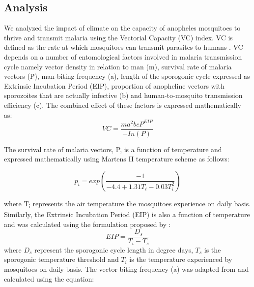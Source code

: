\documentclass[utf8]{FrontiersinHarvard} %
\begin{document}
\subsection{Analysis}
We analyzed the impact of climate on the capacity of anopheles mosquitoes to thrive and transmit malaria using the Vectorial Capacity (VC) index.  VC is defined as the rate at which mosquitoes can transmit parasites to humans \citep{Shapiro2017}. VC depends on a number of entomological factors involved in malaria transmission cycle namely vector density in relation to man (m), survival rate of malaria vectors (P), man-biting frequency (a), length of the sporogonic cycle expressed as Extrinsic Incubation Period (EIP), proportion of anopheline vectors with sporozoites that are actually infective (b) and human-to-mosquito transmission efficiency (c). The combined effect of these factors is expressed mathematically  \citep{paaijmans2012warmer} as:  
\begin{equation}\label{vc}
	VC  = {\dfrac{ma^{2}bcP^{EIP}}{-In(P)}}
\end{equation}

\noindent  The survival rate of malaria vectors, P, is a function of temperature and expressed mathematically using Martens II temperature scheme \citep{ermert2011development,lunde2013malaria} as follows:

\begin{equation}\label{p}
	p_i = exp(\frac{-1}{-4.4+1.31T_i-0.03T_i^2})
\end{equation}

\noindent where T\textsubscript{i} represents the air temperature the mosquitoes experience on daily basis. Similarly, the Extrinsic Incubation Period (EIP) is also a function of temperature and was calculated using the formulation proposed by \citep{detinova1962age}:
\begin{equation}\label{eip}
	EIP = {\dfrac{D_s}{T_i-T_s}}
\end{equation}
\noindent where $D_{s}$ represent the sporogonic cycle length in degree days, $T_{s}$ is the sporogonic temperature threshold and $T_{i}$ is the temperature experienced by mosquitoes on daily basis. The vector biting frequency (a) was adapted from \cite{ceccato2012vectorial} and calculated using the equation:
\end{document}
